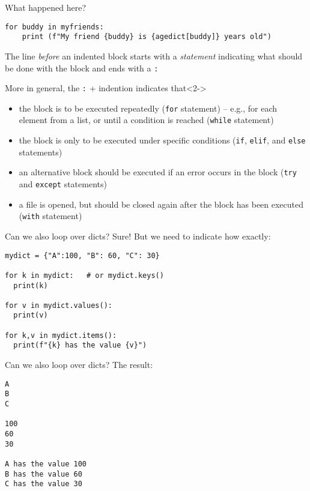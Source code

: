 \documentclass{beamer}
\begin{document}
\begin{frame}[fragile]{What happened here?}
\begin{lstlisting}
for buddy in myfriends:
    print (f"My friend {buddy} is {agedict[buddy]} years old")
\end{lstlisting}
\small
The line \emph{before} an indented block starts with a \emph{statement} indicating what should be done with the block and ends with a \texttt{:}

\footnotesize
\begin{block}{More in general, the \texttt{:} + indention indicates that}<2->
	\begin{itemize}
		\item<3-> the block is to be executed repeatedly (\texttt{for} statement) – e.g., for each element from a list, or until a condition is reached (\texttt{while} statement)
		\item<4-> the block is only to be executed under specific conditions (\texttt{if}, \texttt{elif}, and \texttt{else} statements)
		\item<5-> an alternative block should be executed if an error occurs in the block (\texttt{try} and \texttt{except} statements)
		\item<6-> a file is opened, but should be closed again after the block has been executed (\texttt{with} statement)
	\end{itemize}
\end{block}
\end{frame}



\begin{frame}[fragile]{Can we also loop over dicts?}
Sure! But we need to indicate how exactly:

\begin{lstlisting}
mydict = {"A":100, "B": 60, "C": 30}

for k in mydict:   # or mydict.keys()
  print(k)

for v in mydict.values():
  print(v)

for k,v in mydict.items():
  print(f"{k} has the value {v}")
\end{lstlisting}

\end{frame}




\begin{frame}[fragile]{Can we also loop over dicts?}
The result:

\begin{lstlisting}
A
B
C

100
60
30

A has the value 100
B has the value 60
C has the value 30
\end{lstlisting}

\end{frame}
\end{document}
